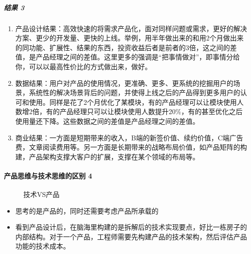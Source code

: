 \documentclass[letterpaper,11pt,english]{sphinxmanual}
\begin{document}
\subparagraph{结果 3\sphinxfootnotemark[161]}
\label{\detokenize{chapter_introduction/PM:id52}}%
\begin{footnotetext}[161]\sphinxAtStartFootnote
{}
%
\end{footnotetext}\ignorespaces \begin{enumerate}
%
\item {} 
产品设计结果：高效快速的将需求产品化，面对同样问题或需求，更好的解决方案、更少的开发量、更快的上线。举例，用半年做出来的和用2个月做出来的同功能、扩展性、结果的东西，投资收益后者是前者的3倍，这之间的差值，是产品经理之间的差值。这里更多的强调是“把事情做对”，即事情分给你，可以以最高性价比的方式做出来，做好。

\item {} 
数据结果：用户对产品的使用情况，更准确、更多、更系统的挖掘用户的场景，系统性的解决场景背后的问题，并使得上线之后的产品得到更多用户的认可和使用。同样是花了2个月优化了某模块，有的产品经理可以让模块使用人数增2倍，有的产品经理只可以让模块使用人数提升20\%，有的甚至优化之后使用量还下降。这些数据之间的差值是产品经理之间的差值。

\item {} 
商业结果：一方面是短期带来的收入，B端的新签价值、续约价值，C端广告费，文章阅读费用等。另一方面是长期带来的战略布局价值，如产品矩阵的构建，产品架构支撑大客户的扩展，支撑在某个领域的布局等。

\end{enumerate}


\paragraph{产品思维与技术思维的区别 4\sphinxfootnotemark[162]}
\label{\detokenize{chapter_introduction/PM:id53}}%
\begin{footnotetext}[162]\sphinxAtStartFootnote
{}
%
\end{footnotetext}\ignorespaces 
\begin{figure}[H]
\centering
\capstart

\noindent{}
\caption{技术VS产品}\label{\detokenize{chapter_introduction/PM:id72}}\end{figure}
\begin{itemize}
\item {} 
思考的是产品的，同时还需要考虑产品所承载的

\item {} 
看到产品设计后，在脑海里构建的是拆解后的技术实现要点，好比一栋房子的内部结构。对于一个产品，工程师需要先构建产品的技术架构，然后评估产品功能的技术成本。

\end{itemize}
\end{document}
